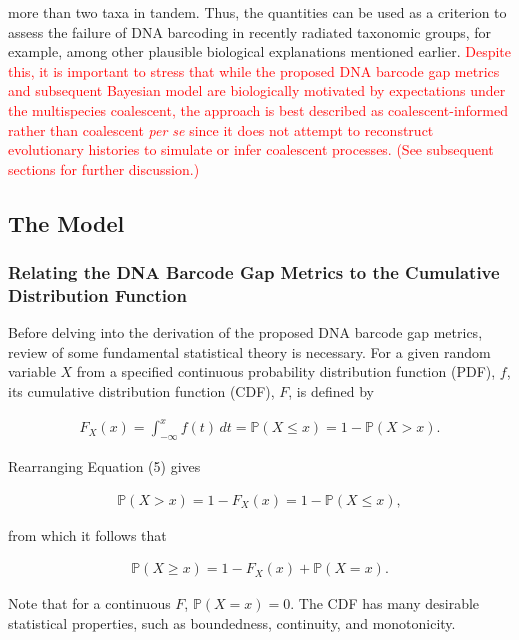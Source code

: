 \documentclass[12pt]{article}
\begin{document}
more than two taxa in tandem. Thus, the quantities can be used as a criterion to assess the failure of DNA barcoding in recently radiated taxonomic groups, for example, among other plausible biological explanations mentioned earlier. \textcolor{red}{Despite this, it is important to stress that while the proposed DNA barcode gap metrics and subsequent Bayesian model are biologically motivated by expectations under the multispecies coalescent, the approach is best described as coalescent-informed rather than coalescent \textit{per se} since it does not attempt to reconstruct evolutionary histories to simulate or infer coalescent processes. (See subsequent sections for further discussion.)}

\subsection{The Model}

\subsubsection{Relating the DNA Barcode Gap Metrics to the Cumulative Distribution Function}

Before delving into the derivation of the proposed DNA barcode gap metrics, review of some fundamental statistical theory is necessary. For a given random variable $X$ from a specified continuous probability distribution function (PDF), $f$, its cumulative distribution function (CDF), $F$, is defined by

\begin{align}
F_X(x) = \int_{-\infty}^{x} f(t) \,dt = \mathbb{P}(X \leq x) = 1 - \mathbb{P}(X > x). 
\end{align}

\noindent Rearranging Equation (5) gives

\begin{align}
\mathbb{P}(X > x) = 1 - F_X(x) = 1 - \mathbb{P}(X \leq x) ,
\end{align}

\noindent from which it follows that

\begin{align}
\mathbb{P}(X \geq x) = 1 - F_X(x) + \mathbb{P}(X = x).
\end{align}

\noindent Note that for a continuous $F$, $\mathbb{P}(X = x) = 0$. The CDF has many desirable statistical properties, such as boundedness, continuity, and monotonicity. 
\end{document}
